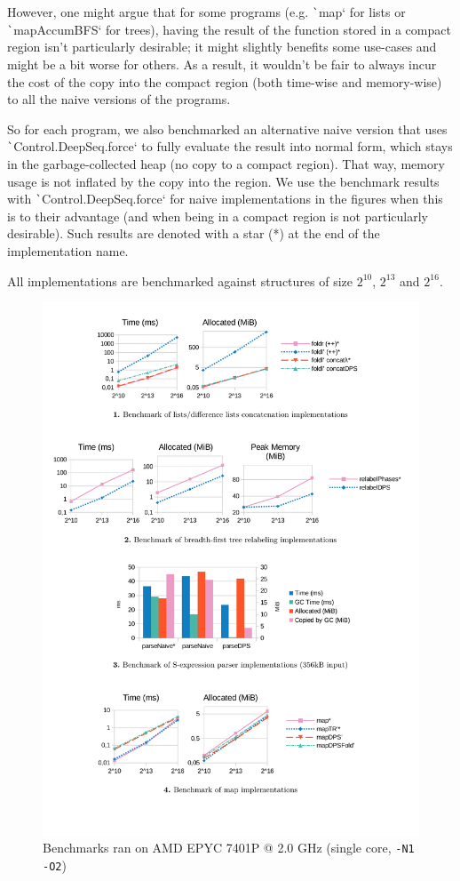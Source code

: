 \documentclass[english]{jflart}
\begin{document}
However, one might argue that for some programs (e.g. \texttt`map` for lists or \texttt`mapAccumBFS` for trees), having the result of the function stored in a compact region isn't particularly desirable; it might slightly benefits some use-cases and might be a bit worse for others. As a result, it wouldn't be fair to always incur the cost of the copy into the compact region (both time-wise and memory-wise) to all the naive versions of the programs.

So for each program, we also benchmarked an alternative naive version that uses \texttt`Control.DeepSeq.force` to fully evaluate the result into normal form, which stays in the garbage-collected heap (no copy to a compact region). That way, memory usage is not inflated by the copy into the region. We use the benchmark results with \texttt`Control.DeepSeq.force` for naive implementations in the figures when this is to their advantage (and when being in a compact region is not particularly desirable). Such results are denoted with a star (*) at the end of the implementation name.

All implementations are benchmarked against structures of size $2^{10}$, $2^{13}$ and $2^{16}$.

\begin{figure}[t]\centering
  \includegraphics[width=14cm]{bench-charts.pdf}
  \caption{Benchmarks ran on AMD EPYC 7401P @ 2.0 GHz (single core, \texttt{-N1 -O2})}
  \label{fig:bench-charts}
\end{figure}
\end{document}
